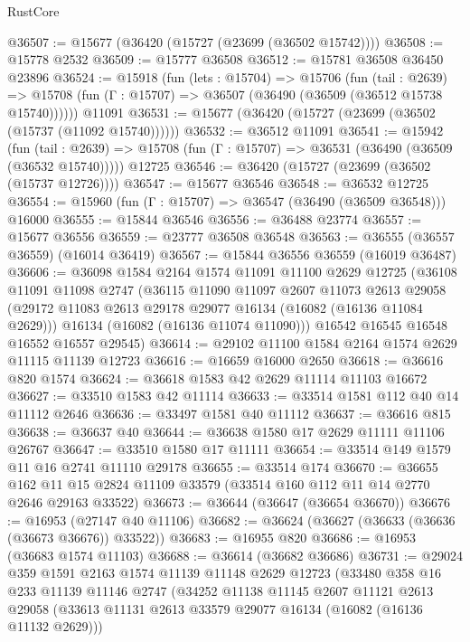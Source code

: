 \begin{lexlean}{RustCore}
\begin{coremodule}
@36507 := @15677 (@36420 (@15727 (@23699 (@36502 @15742))))
@36508 := @15778 @2532
@36509 := @15777 @36508
@36512 := @15781 @36508 @36450 @23896
@36524 := @15918
    (fun (lets : @15704) =>
    @15706
      (fun (tail : @2639) =>
      @15708 (fun (Γ : @15707) => @36507 (@36490 (@36509 (@36512 @15738 @15740))))))
    @11091
@36531 := @15677 (@36420 (@15727 (@23699 (@36502 (@15737 (@11092 @15740))))))
@36532 := @36512 @11091
@36541 := @15942
    (fun (tail : @2639) => @15708 (fun (Γ : @15707) => @36531 (@36490 (@36509 (@36532 @15740)))))
    @12725
@36546 := @36420 (@15727 (@23699 (@36502 (@15737 @12726))))
@36547 := @15677 @36546
@36548 := @36532 @12725
@36554 := @15960 (fun (Γ : @15707) => @36547 (@36490 (@36509 @36548))) @16000
@36555 := @15844 @36546
@36556 := @36488 @23774
@36557 := @15677 @36556
@36559 := @23777 @36508 @36548
@36563 := @36555 (@36557 @36559) (@16014 @36419)
@36567 := @15844 @36556 @36559 (@16019 @36487)
@36606 := @36098
    @1584
    @2164
    @1574
    @11091
    @11100
    @2629
    @12725
    (@36108
      @11091
      @11098
      @2747
      (@36115
        @11090
        @11097
        @2607
        @11073
        @2613
        @29058
        (@29172 @11083 @2613 @29178 @29077 @16134 (@16082 (@16136 @11084 @2629)))
        @16134
        (@16082 (@16136 @11074 @11090)))
      @16542
      @16545
      @16548
      @16552
      @16557
      @29545)
@36614 := @29102 @11100 @1584 @2164 @1574 @2629 @11115 @11139 @12723
@36616 := @16659 @16000 @2650
@36618 := @36616 @820 @1574
@36624 := @36618 @1583 @42 @2629 @11114 @11103 @16672
@36627 := @33510 @1583 @42 @11114
@36633 := @33514 @1581 @112 @40 @14 @11112 @2646
@36636 := @33497 @1581 @40 @11112
@36637 := @36616 @815
@36638 := @36637 @40
@36644 := @36638 @1580 @17 @2629 @11111 @11106 @26767
@36647 := @33510 @1580 @17 @11111
@36654 := @33514 @149 @1579 @11 @16 @2741 @11110 @29178
@36655 := @33514 @174
@36670 := @36655
    @162
    @11
    @15
    @2824
    @11109
    @33579
    (@33514 @160 @112 @11 @14 @2770 @2646 @29163 @33522)
@36673 := @36644 (@36647 (@36654 @36670))
@36676 := @16953 (@27147 @40 @11106)
@36682 := @36624 (@36627 (@36633 (@36636 (@36673 @36676)) @33522))
@36683 := @16955 @820
@36686 := @16953 (@36683 @1574 @11103)
@36688 := @36614 (@36682 @36686)
@36731 := @29024
    @359
    @1591
    @2163
    @1574
    @11139
    @11148
    @2629
    @12723
    (@33480
      @358
      @16
      @233
      @11139
      @11146
      @2747
      (@34252
        @11138
        @11145
        @2607
        @11121
        @2613
        @29058
        (@33613 @11131 @2613 @33579 @29077 @16134 (@16082 (@16136 @11132 @2629)))

\end{coremodule}
\end{lexlean}

